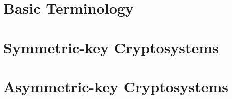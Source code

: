 \documentclass{report}
\begin{document}
	\section{Basic Terminology}
	
	\section{Symmetric-key Cryptosystems}

	\section{Asymmetric-key Cryptosystems}
\end{document}
